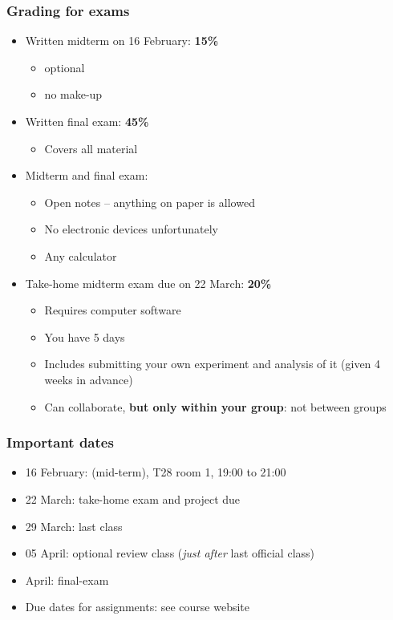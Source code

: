 \begin{frame}\frametitle{Grading for exams}
	\begin{itemize}
		\item	Written midterm on 16 February: \textbf{15\%} 
		\begin{itemize}
			\item	optional 
			\item	no make-up 
		\end{itemize}
	\end{itemize}
	\begin{itemize}
		\item	Written final exam: \textbf{45\%} 
		\begin{itemize}
			\item	Covers all material 
		\end{itemize}
	\end{itemize}
	\begin{itemize}
		\item	Midterm and final exam: 
		\begin{itemize}
			\item	Open notes -- anything on paper is allowed 
			\item	No electronic devices unfortunately 
			\item	Any calculator 
		\end{itemize}
	\end{itemize}
	\begin{itemize}
		\item	Take-home midterm exam due on 22 March: \textbf{20\%} 
		\begin{itemize}
			\item	Requires computer software 
			\item	You have 5 days 
			\item	Includes submitting your own experiment and analysis of it (given 4 weeks in advance) 
			\item	Can collaborate, \textbf{but only within your group}: not between groups 
		\end{itemize}
	\end{itemize}
\end{frame}

\begin{frame}\frametitle{Important dates}
	\begin{itemize}
		\item	16 February: (mid-term), T28 room 1, 19:00 to 21:00 
		\item	22 March: take-home exam and project due 
		\item	29 March: last class 
		\item	05 April: optional review class (\emph{just after} last official class) 
		\item	April: final-exam 
	\end{itemize}
	\begin{itemize}
		\item	Due dates for assignments: see course website 
	\end{itemize}
\end{frame}

